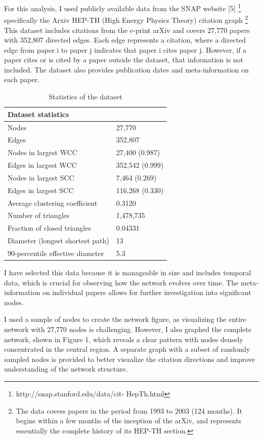 \documentclass{article}
\begin{document}
For this analysis, I used publicly available data from the SNAP website [5]
\footnote{http://snap.stanford.edu/data/cit- HepTh.html} 
specifically the Arxiv HEP-TH (High Energy Physics Theory) citation graph
\footnote{The data covers papers in the period from 1993 to 2003 (124 months). It begins within a few months of the inception of the arXiv, and represents essentially the complete history of its HEP-TH section.}
This dataset includes citations from the e-print arXiv and covers 27,770 papers with 352,807 directed edges. Each edge represents a citation, where a directed edge from paper i to paper j indicates that paper i cites paper j. However, if a paper cites or is cited by a paper outside the dataset, that information is not included. The dataset also provides publication dates and meta-information on each paper.

\begin{table}[h]
    \centering
    \begin{tabular}{ll}
        \hline
        \textbf{Dataset statistics} & \\
        \hline
        Nodes & 27,770 \\
        Edges & 352,807 \\
        Nodes in largest WCC & 27,400 (0.987) \\
        Edges in largest WCC & 352,542 (0.999) \\
        Nodes in largest SCC & 7,464 (0.269) \\
        Edges in largest SCC & 116,268 (0.330) \\
        Average clustering coefficient & 0.3120 \\
        Number of triangles & 1,478,735 \\
        Fraction of closed triangles & 0.04331 \\
        Diameter (longest shortest path) & 13 \\
        90-percentile effective diameter & 5.3 \\
        \hline
    \end{tabular}
    \caption{Statistics of the dataset}
    \label{tab:dataset_stats}
\end{table}

I have selected this data because it is manageable in size and includes temporal data, which is crucial for observing how the network evolves over time. The meta-information on individual papers allows for further investigation into significant nodes.

I used a sample of nodes to create the network figure, as visualizing the entire network with 27,770 nodes is challenging. However, I also graphed the complete network, shown in Figure 1, which reveals a clear pattern with nodes densely concentrated in the central region. A separate graph with a subset of randomly sampled nodes is provided to better visualize the citation directions and improve understanding of the network structure.
\end{document}
